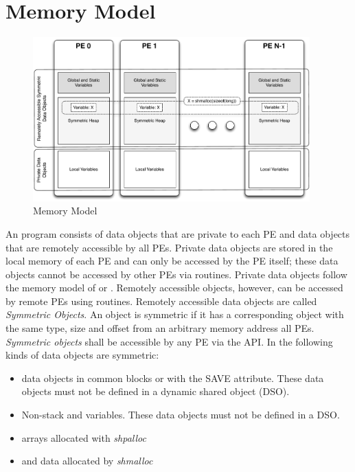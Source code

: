 \section{Memory Model}
\begin{figure}[h]
\includegraphics[width=0.95\textwidth]{diagrams/updated/mem_model}      
\caption{\OSH{} Memory Model}                                   
\label{fig:mem_model}                                               
\end{figure}      
An \openshmem program consists of data objects that are private to each \ac{PE} and data 
objects that are remotely accessible by all \ac{PE}s. Private data objects are stored in the local
memory of each \ac{PE} and can only be accessed by the \ac{PE} itself; these data objects
cannot be accessed by other \ac{PE}s via \openshmem routines. Private data objects
follow the memory model of \Clang{} or \Fortran{}. Remotely accessible
objects, however, can be accessed by remote \ac{PE}s using \openshmem routines.
Remotely accessible data objects are called \emph{Symmetric Objects}.
An object is symmetric if it has a corresponding object with the same
type, size and offset from an arbitrary memory address all \ac{PE}s. \emph{Symmetric objects } shall be accessible by any \ac{PE} via the \openshmem \ac{API}.  
In \openshmem{} the following kinds of data objects are symmetric:
\begin{itemize}
  \item \Fortran{} data objects in common blocks or with the  SAVE  attribute. These data objects	must not be defined in a dynamic shared object (DSO).
  \item Non-stack \Clang{} and \Cpp{} variables.   These  data	objects must  not  be defined in a DSO.
  \item \Fortran{} arrays allocated with \textit{shpalloc} 
  \item \Clang{} and \Cpp{} data allocated by \textit{shmalloc}
\end{itemize}       

